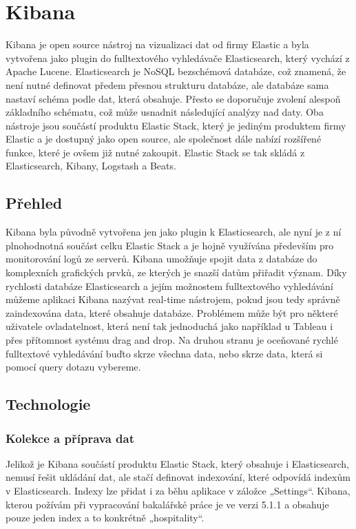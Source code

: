\documentclass[czech,BP]{thesiskiv}
\begin{document}
 \section{Kibana}
 Kibana je open source nástroj na vizualizaci dat od firmy Elastic a byla vytvořena jako plugin do fulltextového vyhledávače Elasticsearch, který vychází z Apache Lucene. Elasticsearch je NoSQL bezschémová databáze, což znamená, že není nutné definovat předem přesnou strukturu databáze, ale databáze sama nastaví schéma podle dat, která obsahuje. Přesto se doporučuje zvolení alespoň základního schématu, což může usnadnit následující analýzy nad daty.\cite{SchemaElastic} Oba nástroje jsou součástí produktu Elastic Stack, který je jediným produktem firmy Elastic a je dostupný jako open source, ale společnost dále nabízí rozšířené funkce, které je ovšem již nutné zakoupit. Elastic Stack se tak skládá z Elasticsearch, Kibany, Logstash a Beats.
 
 \subsection{Přehled}
 Kibana byla původně vytvořena jen jako plugin k Elasticsearch, ale nyní je z ní plnohodnotná součást celku Elastic Stack a je hojně využívána především pro monitorování logů ze serverů. Kibana umožňuje spojit data z databáze do komplexních grafických prvků, ze kterých je snazší datům přiřadit význam. Díky rychlosti databáze Elasticsearch a jejím možnostem fulltextového vyhledávání můžeme aplikaci Kibana nazývat real-time nástrojem, pokud jsou tedy správně zaindexována data, které obsahuje databáze. Problémem může být pro některé uživatele ovladatelnost, která není tak jednoduchá jako například u Tableau i přes přítomnost systému drag and drop. Na druhou stranu je oceňované rychlé fulltextové vyhledávání buďto skrze všechna data, nebo skrze data, která si pomocí query dotazu vybereme.
 \subsection{Technologie}
 \subsubsection{Kolekce a příprava dat}
 Jelikož je Kibana součástí produktu Elastic Stack, který obsahuje i Elasticsearch, nemusí řešit ukládání dat, ale stačí definovat indexování, které odpovídá indexům v Elasticsearch. Indexy lze přidat i za běhu aplikace v záložce „Settings“. Kibana, kterou požívám při vypracování bakalářské práce je ve verzi 5.1.1 a obsahuje pouze jeden index a to konkrétně „hospitality“.
\end{document}
